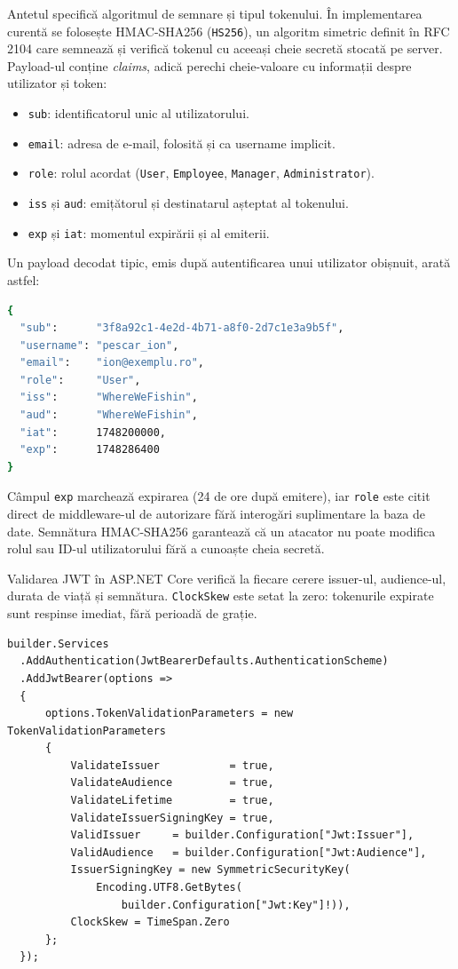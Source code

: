 Antetul specifică algoritmul de semnare și tipul tokenului. În implementarea curentă se folosește HMAC-SHA256 (\texttt{HS256}), un algoritm simetric definit în RFC 2104 \citep{hmac-rfc2104} care semnează și verifică tokenul cu aceeași cheie secretă stocată pe server. Payload-ul conține \emph{claims}, adică perechi cheie-valoare cu informații despre utilizator și token:

\begin{itemize}
  \item \texttt{sub}: identificatorul unic al utilizatorului.
  \item \texttt{email}: adresa de e-mail, folosită și ca username implicit.
  \item \texttt{role}: rolul acordat (\texttt{User}, \texttt{Employee}, \texttt{Manager}, \texttt{Administrator}).
  \item \texttt{iss} și \texttt{aud}: emițătorul și destinatarul așteptat al tokenului.
  \item \texttt{exp} și \texttt{iat}: momentul expirării și al emiterii.
\end{itemize}

Un payload decodat tipic, emis după autentificarea unui utilizator obișnuit, arată astfel:

\begin{lstlisting}[language=bash, caption={Exemplu de payload JWT decodat pentru un utilizator WhereWeFishin}]
{
  "sub":      "3f8a92c1-4e2d-4b71-a8f0-2d7c1e3a9b5f",
  "username": "pescar_ion",
  "email":    "ion@exemplu.ro",
  "role":     "User",
  "iss":      "WhereWeFishin",
  "aud":      "WhereWeFishin",
  "iat":      1748200000,
  "exp":      1748286400
}
\end{lstlisting}

Câmpul \texttt{exp} marchează expirarea (24 de ore după emitere), iar \texttt{role} este citit direct de middleware-ul de autorizare fără interogări suplimentare la baza de date. Semnătura HMAC-SHA256 garantează că un atacator nu poate modifica rolul sau ID-ul utilizatorului fără a cunoaște cheia secretă.

Validarea JWT în ASP.NET Core \citep{aspnetcore} verifică la fiecare cerere issuer-ul, audience-ul, durata de viață și semnătura. \texttt{ClockSkew} este setat la zero: tokenurile expirate sunt respinse imediat, fără perioadă de grație.

\begin{lstlisting}[language={[Sharp]C}, caption={Configurarea autentificării JWT în Program.cs}]
builder.Services
  .AddAuthentication(JwtBearerDefaults.AuthenticationScheme)
  .AddJwtBearer(options =>
  {
      options.TokenValidationParameters = new TokenValidationParameters
      {
          ValidateIssuer           = true,
          ValidateAudience         = true,
          ValidateLifetime         = true,
          ValidateIssuerSigningKey = true,
          ValidIssuer     = builder.Configuration["Jwt:Issuer"],
          ValidAudience   = builder.Configuration["Jwt:Audience"],
          IssuerSigningKey = new SymmetricSecurityKey(
              Encoding.UTF8.GetBytes(
                  builder.Configuration["Jwt:Key"]!)),
          ClockSkew = TimeSpan.Zero
      };
  });
\end{lstlisting}


